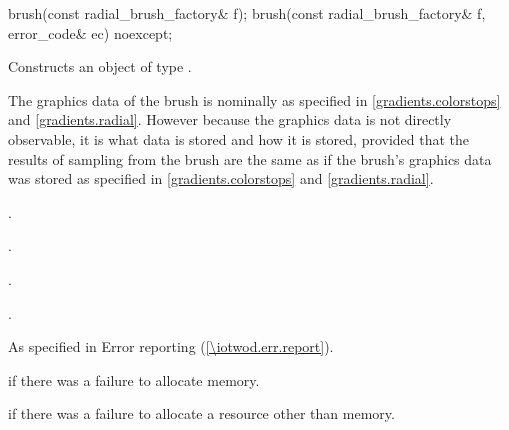 \begin{itemdecl}
brush(const radial_brush_factory& f);
brush(const radial_brush_factory& f, error_code& ec) noexcept;
\end{itemdecl}
\begin{itemdescr}
\pnum
\effects
Constructs an object of type .

\pnum
The graphics data of the brush is nominally as specified in \ref{gradients.colorstops} and \ref{gradients.radial}. However because the graphics data is not directly observable, it is \unspecnorm what data is stored and how it is stored, provided that the results of sampling from the brush are the same as if the brush's graphics data was stored as specified in \ref{gradients.colorstops} and \ref{gradients.radial}.

\pnum
\postconditions
{}.

.

.

.

\pnum
\throws
As specified in Error reporting (\ref{\iotwod.err.report}).

\pnum
\errors
{} if there was a failure to allocate memory.

 if there was a failure to allocate a resource other than memory.
\end{itemdescr}

